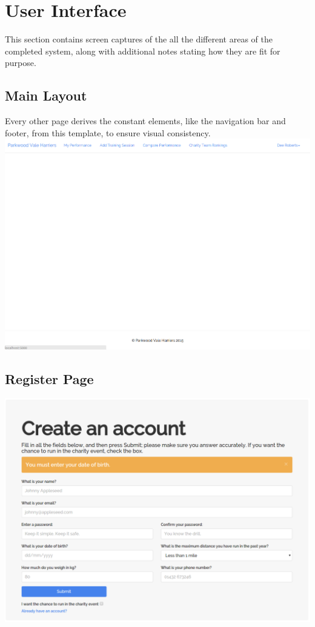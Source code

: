 \documentclass{article}[12pt,a4paper]
\begin{document}
\section{User Interface}
This section contains screen captures of the all the different areas of the completed system, along with additional notes stating how they are fit for purpose.

\subsection{Main Layout}
Every other page derives the constant elements, like the navigation bar and footer, from this template, to ensure visual consistency.
\includegraphics[scale=0.30]{final_ui/layout}

\subsection{Register Page}
\includegraphics[scale=0.35]{final_ui/register}
\end{document}
